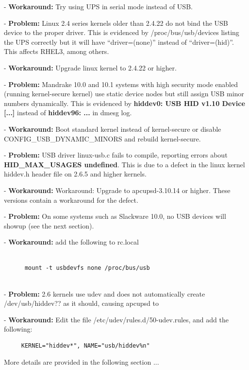 - {\bf Workaround:} Try using UPS in serial mode instead of USB.  

- {\bf Problem:} Linux 2.4 series kernels older than 2.4.22 do not bind the
USB device to the proper driver. This is evidenced by /proc/bus/usb/devices
listing the UPS correctly but it will have ``driver=(none)'' instead of
``driver=(hid)''. This affects RHEL3, among others.  

- {\bf Workaround:} Upgrade linux kernel to 2.4.22 or higher.  

- {\bf Problem:} Mandrake 10.0 and 10.1 systems with high security mode
enabled (running kernel-secure kernel) use static device nodes but still
assign USB minor numbers dynamically. This is evidenced by {\bf hiddev0: USB
HID v1.10 Device [...]} instead of {\bf hiddev96: ...} in dmesg log.  

- {\bf Workaround:} Boot standard kernel instead of kernel-secure or disable
CONFIG\_USB\_DYNAMIC\_MINORS and rebuild kernel-secure.  

- {\bf Problem:} USB driver linux-usb.c fails to compile, reporting errors
about {\bf HID\_MAX\_USAGES undefined}. This is due to a defect in the linux
kernel hiddev.h header file on 2.6.5 and higher kernels.  

- {\bf Workaround:} Workaround: Upgrade to apcupsd-3.10.14 or higher.  These
versions contain a workaround for the defect.  

- {\bf Problem:} On some systems such as Slackware 10.0, no USB devices will
showup (see the next section).  

- {\bf Workaround:} add the following to rc.local 

\footnotesize
\begin{verbatim}
     
      mount -t usbdevfs none /proc/bus/usb
     
\end{verbatim}
\normalsize

- {\bf Problem:} 2.6 kernels use udev and does not automatically create
/dev/usb/hiddev?? as it should, causing apcupsd to  

- {\bf Workaround:} Edit the file /etc/udev/rules.d/50-udev.rules, and add the
following: 

\footnotesize
\begin{verbatim}
     KERNEL="hiddev*", NAME="usb/hiddev%n"
\end{verbatim}
\normalsize

More details are provided in the following section ... 

